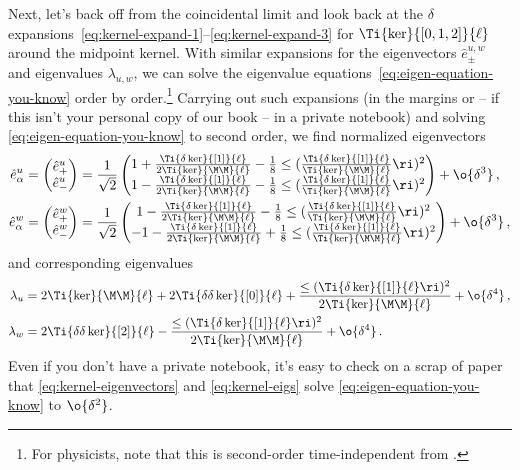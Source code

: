 Next, let's back off from the coincidental limit and look back at the $\delta$ expansions~\eqref{eq:kernel-expand-1}--\eqref{eq:kernel-expand-3} for $\Ti{\ker}{[0,1,2]}{\ell}$ around the midpoint kernel. With similar expansions for the eigenvectors $\hat{e}^{u,w}_\pm$ and eigenvalues $\lambda_{u,w}$, we can solve the eigenvalue equations~\eqref{eq:eigen-equation-you-know} order by order.\footnote{
    For physicists, note that this is second-order time-independent  from .
} 
Carrying out such expansions (in the margins or -- if this isn't your personal copy of our book -- in a private notebook) and solving \eqref{eq:eigen-equation-you-know} to second order, we find normalized eigenvectors 
\begin{align}\label{eq:kernel-eigenvectors}
\hat{e}^{u}_{\alpha}&= \begin{pmatrix} 
\hat{e}^{u}_{+} \\
\hat{e}^{u}_{-}
\end{pmatrix}
= \frac{1}{\sqrt{2}}\begin{pmatrix} 
1 + \frac{\Ti{\delta\ker}{[1]}{\ell}}{2\Ti{\ker}{\M\M}{\ell} }- \frac{1}{8}\le(\frac{\Ti{\delta\ker}{[1]}{\ell}}{\Ti{\ker}{\M\M}{\ell}}\ri)^2 \\
1 - \frac{\Ti{\delta\ker}{[1]}{\ell}}{2\Ti{\ker}{\M\M}{\ell} }- \frac{1}{8}\le(\frac{\Ti{\delta\ker}{[1]}{\ell}}{\Ti{\ker}{\M\M}{\ell}}\ri)^2 
\end{pmatrix} + \o{\delta^3} \, , \\ \notag
\hat{e}^{w}_{\alpha}&= \begin{pmatrix} 
\hat{e}^{w}_{+} \\
\hat{e}^{w}_{-}
\end{pmatrix}
=  \frac{1}{\sqrt{2}}\begin{pmatrix} 
1 - \frac{\Ti{\delta\ker}{[1]}{\ell}}{2\Ti{\ker}{\M\M}{\ell} }- \frac{1}{8}\le(\frac{\Ti{\delta\ker}{[1]}{\ell}}{\Ti{\ker}{\M\M}{\ell}}\ri)^2 \\
-1 - \frac{\Ti{\delta\ker}{[1]}{\ell}}{2\Ti{\ker}{\M\M}{\ell} }+ \frac{1}{8}\le(\frac{\Ti{\delta\ker}{[1]}{\ell}}{\Ti{\ker}{\M\M}{\ell}}\ri)^2  
\end{pmatrix} + \o{\delta^3} \, ,
\end{align}
and corresponding eigenvalues
\begin{align}\label{eq:kernel-eigs}
\lambda_u&= 2 \Ti{\ker}{\M\M}{\ell} + 2 \Ti{\delta\delta\ker}{[0]}{\ell} + \frac{\le(\Ti{\delta\ker}{[1]}{\ell}\ri)^2}{2\Ti{\ker}{\M\M}{\ell} } + \o{\delta^4} \, , \\ 
\lambda_w &= 2 \Ti{\delta\delta\ker}{[2]}{\ell} - \frac{\le(\Ti{\delta\ker}{[1]}{\ell}\ri)^2}{2\Ti{\ker}{\M\M}{\ell} } + \o{\delta^4} \,  .\notag
\end{align}
Even if you don't have a private notebook, it's easy to check on a scrap of paper that \eqref{eq:kernel-eigenvectors} and \eqref{eq:kernel-eigs} solve \eqref{eq:eigen-equation-you-know} to $\o{\delta^2}$.


